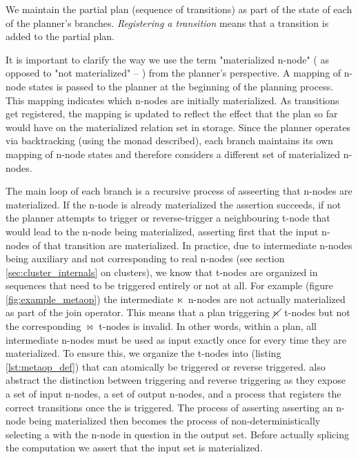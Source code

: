 We maintain the partial plan (sequence of transitions) as part of the
state of each of the planner's branches. \emph{Registering a
  transition} means that a transition is added to the partial plan.
  
It is important to clarify the way we use the term "materialized n-node"
( as opposed to "not materialized" -- ) from the planner's
perspective. A mapping of n-node states is passed to the planner at the
beginning of the planning process. This mapping indicates which n-nodes
are initially materialized. As transitions get registered,
the mapping is updated to reflect the effect that the plan so far
would have on the materialized relation set in storage. Since the
planner operates via backtracking (using the  monad described),
each branch maintains its own mapping of n-node states and therefore
considers a different set of materialized n-nodes.



The main loop of each branch is a recursive process of asseerting that
n-nodes are materialized. If the n-node is already materialized the
assertion succeeds, if not the planner attempts to trigger or reverse-trigger
a neighbouring t-node that would lead to the n-node being
materialized, asserting first that the input n-nodes of that transition
are materialized. In practice, due to intermediate n-nodes being
auxiliary and not corresponding to real n-nodes (see section
\ref{sec:cluster_internals} on clusters), we know that t-nodes are
organized in sequences that need to be triggered entirely or not at
all. For example (figure \ref{fig:example_metaop}) the intermediate
\(\ltimes\) n-nodes are not actually materialized as part of the join
operator. This means that a plan triggering \(\cancel\ltimes\) t-nodes but
not the corresponding \(\Join\) t-nodes is invalid. In other words,
within a plan, all intermediate n-nodes must be used as input exactly
once for every time they are materialized. To ensure this, we organize
the t-nodes into  (listing \ref{lst:metaop_def}) that
can atomically be triggered or reverse triggered.  also
abstract the distinction between triggering and reverse triggering as
they expose a set of input n-nodes, a set of output n-nodes, and a process that
registers the correct transitions once the  is
triggered. The process of asserting asserting an n-node being
materialized then becomes the process of non-deterministically
selecting a  with the n-node in question in the output
set. Before actually splicing the  computation we assert
that the input set is materialized.


